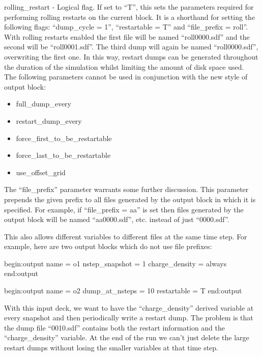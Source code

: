 {\emphtext rolling\_restart} - Logical flag. If set to ``T'', this sets the
  parameters required for performing rolling restarts on the current block.
  It is a shorthand for setting the following flags: ``dump\_cycle = 1'',
  ``restartable = T'' and ``file\_prefix = roll''.
  With rolling restarts enabled the first file will be named ``roll0000.sdf''
  and the second will be ``roll0001.sdf''. The third dump will again be
  named ``roll0000.sdf'', overwriting the first one. In this way, restart
  dumps can be generated throughout the duration of the simulation whilst
  limiting the amount of disk space used.\\

The following parameters cannot be used in conjunction with the new style
of output block:

\begin{itemize}
\item full\_dump\_every
\item restart\_dump\_every
\item force\_first\_to\_be\_restartable
\item force\_last\_to\_be\_restartable
\item use\_offset\_grid
\end{itemize}

The ``file\_prefix'' parameter warrants some further discussion. This
parameter prepends the given prefix to all files generated by the output
block in which it is specified.  For example, if ``file\_prefix = aa'' is
set then files generated by the output block will be named ``aa0000.sdf'',
etc. instead of just ``0000.sdf''.

This also allows different variables to different files at the same
time step. For example, here are two output blocks which do not use file
prefixes:
\begin{boxverbatim}
begin:output
   name = o1
   nstep_snapshot = 1
   charge_density = always
end:output

begin:output
   name = o2
   dump_at_nsteps = 10
   restartable = T
end:output
\end{boxverbatim}

With this input deck, we want to have the ``charge\_density''
derived variable at every snapshot and then periodically write a
restart dump. The problem is that the dump file ``0010.sdf''
contains both the restart information and the ``charge\_density''
variable. At the end of the run we can't just delete the large
restart dumps without losing the smaller variables at that
time step.

